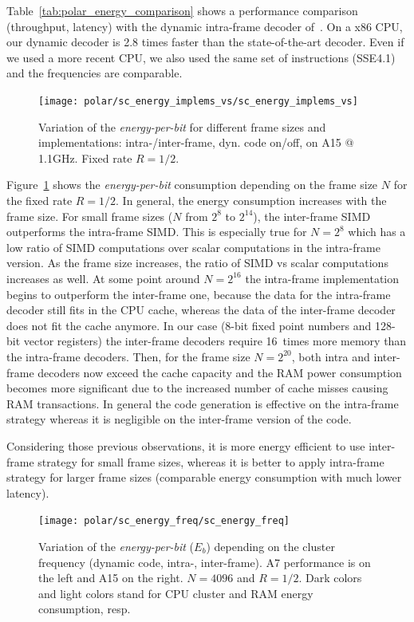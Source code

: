 Table~\ref{tab:polar_energy_comparison} shows a performance comparison
(throughput, latency) with the dynamic intra-frame decoder of~\cite{Giard2014}.
On a x86 CPU, our dynamic decoder is 2.8 times faster than the state-of-the-art
decoder. Even if we used a more recent CPU, we also used the same set of
instructions (SSE4.1) and the frequencies are comparable.

\begin{figure}
  \centering
  \texttt{[image: polar/sc\_energy\_implems\_vs/sc\_energy\_implems\_vs]}
  \caption{Variation of the \emph{energy-per-bit} for different frame sizes and
    implementations: intra-/inter-frame, dyn. code on/off, on A15 @ 1.1GHz.
    Fixed rate $R = 1/2$.}
  \label{plot:polar_sc_energy_implems_vs}
\end{figure}

Figure~\ref{plot:polar_sc_energy_implems_vs} shows the \emph{energy-per-bit}
consumption depending on the frame size $N$ for the fixed rate $R = 1/2$. In
general, the energy consumption increases with the frame size. For small frame
sizes ($N$ from $2^{8}$ to $2^{14}$), the inter-frame SIMD outperforms the
intra-frame SIMD. This is especially true for $N = 2^8$ which has a low ratio of
SIMD computations over scalar computations in the intra-frame version. As the
frame size increases, the ratio of SIMD vs scalar computations increases as
well. At some point around $N = 2^{16}$ the intra-frame implementation begins
to outperform the inter-frame one, because the data for the intra-frame decoder
still fits in the CPU cache, whereas the data of the inter-frame decoder does
not fit the cache anymore. In our case (8-bit fixed point numbers and 128-bit
vector registers) the inter-frame decoders require 16~times more memory than the
intra-frame decoders. Then, for the frame size $N = 2^{20}$, both intra and
inter-frame decoders now exceed the cache capacity and the RAM power consumption
becomes more significant due to the increased number of cache misses causing RAM
transactions. In general the code generation is effective on the intra-frame
strategy whereas it is negligible on the inter-frame version of the code.

Considering those previous observations, it is more energy efficient to use
inter-frame strategy for small frame sizes, whereas it is better to apply
intra-frame strategy for larger frame sizes (comparable energy consumption with
much lower latency).

\begin{figure}
  \centering
  \texttt{[image: polar/sc\_energy\_freq/sc\_energy\_freq]}
  \caption{Variation of the \emph{energy-per-bit} ($E_b$) depending on the
    cluster frequency (dynamic code, intra-, inter-frame).
    A7 performance is on the left and A15 on the right. $N = 4096$ and $R = 1/2$.
    Dark colors and light colors stand for CPU cluster and RAM energy consumption,
    resp.}
  \label{plot:polar_sc_energy_freq}
\end{figure}

